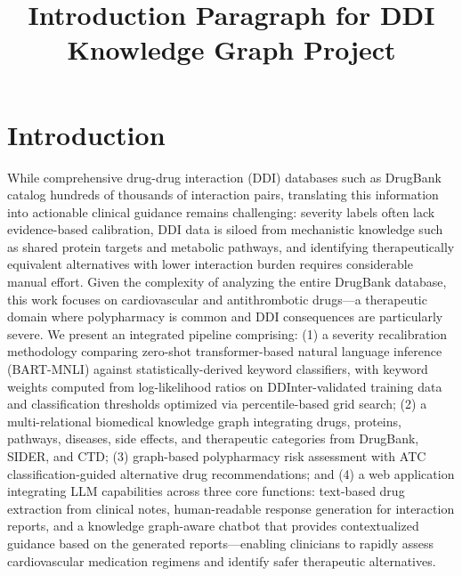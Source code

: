 \documentclass[11pt,a4paper]{article}
\title{\textbf{Introduction Paragraph for DDI Knowledge Graph Project}}
\author{}
\date{}
\begin{document}
\maketitle

\section*{Introduction}

While comprehensive drug-drug interaction (DDI) databases such as DrugBank catalog hundreds of thousands of interaction pairs, translating this information into actionable clinical guidance remains challenging: severity labels often lack evidence-based calibration, DDI data is siloed from mechanistic knowledge such as shared protein targets and metabolic pathways, and identifying therapeutically equivalent alternatives with lower interaction burden requires considerable manual effort. Given the complexity of analyzing the entire DrugBank database, this work focuses on cardiovascular and antithrombotic drugs---a therapeutic domain where polypharmacy is common and DDI consequences are particularly severe. We present an integrated pipeline comprising: (1) a severity recalibration methodology comparing zero-shot transformer-based natural language inference (BART-MNLI) against statistically-derived keyword classifiers, with keyword weights computed from log-likelihood ratios on DDInter-validated training data and classification thresholds optimized via percentile-based grid search; (2) a multi-relational biomedical knowledge graph integrating drugs, proteins, pathways, diseases, side effects, and therapeutic categories from DrugBank, SIDER, and CTD; (3) graph-based polypharmacy risk assessment with ATC classification-guided alternative drug recommendations; and (4) a web application integrating LLM capabilities across three core functions: text-based drug extraction from clinical notes, human-readable response generation for interaction reports, and a knowledge graph-aware chatbot that provides contextualized guidance based on the generated reports---enabling clinicians to rapidly assess cardiovascular medication regimens and identify safer therapeutic alternatives.
\end{document}
